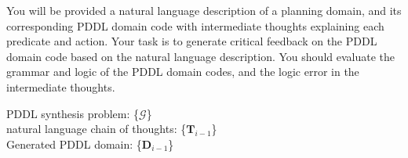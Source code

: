 \begin{tcolorbox}[title = {Prompt template for $f_\mathrm{opt}(\cdot)$},
  fonttitle = \bfseries, fontupper = \sffamily\small, fontlower = \sffamily\small, colframe=c1, colback=green2!5]
You will be provided a natural language description of a planning domain, and its corresponding PDDL domain code with intermediate thoughts explaining each predicate and action. Your task is to generate critical feedback on the PDDL domain code based on the natural language description. 
You should evaluate the grammar and logic of the PDDL domain codes, and the logic error in the intermediate thoughts.

PDDL synthesis problem: \{$\mathcal{G}$\}\\
natural language chain of thoughts: \{$\mathbf{T}_{i-1}$\}\\
Generated PDDL domain: \{$\mathbf{D}_{i-1}$\}

\end{tcolorbox}

